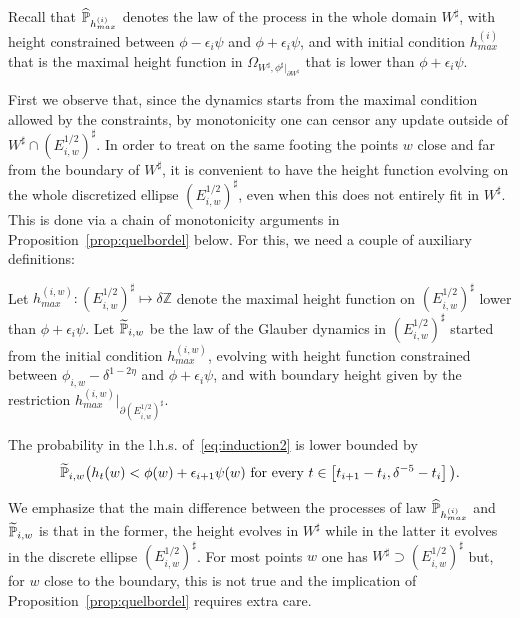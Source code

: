 \documentclass[AHL,Unicode,longabstracts,published]{cedram}
\newcommand{\Z}{\mathbb{Z}}
\renewcommand{\P}{\mathbb{P}}
\newcommand{\eps}{\epsilon}
\renewcommand{\d}{{\sharp }}
\let\oldtilde\tilde
\renewcommand*{\tilde}[1]{\mathchoice{\widetilde{#1}}{\widetilde{#1}}{\oldtilde{#1}}{\oldtilde{#1}}}
\let\oldhat\hat
\renewcommand*{\hat}[1]{\mathchoice{\widehat{#1}}{\widehat{#1}}{\oldhat{#1}}{\oldhat{#1}}}
\begin{document}
Recall that $\hat\P_{h^{(i)}_{max}}$ denotes the law of the process in the whole domain $W^\d$, with height constrained between $\phi-\epsilon_i\psi$ and $\phi+\epsilon_i\psi$, and with initial condition $h^{(i)}_{max}$ that is the maximal height function in $\Omega_{W^\d,\phi^\d|_{\partial W^\d}}$ that is lower than $\phi+\epsilon_i\psi$.

First we observe that, since the dynamics starts from the maximal condition allowed by the constraints, by monotonicity one can censor any update outside of $W^\d \cap (E^{1/2}_{i,w})^\d$. In order to treat on the same footing the points $w$ close and far from the boundary of $W^\d$, it is convenient to have the height function evolving on the whole discretized ellipse $(E^{1/2}_{i,w})^\d$, even when this does not entirely fit in $W^\d$. This is done via a chain of monotonicity arguments in Proposition~\ref{prop:quelbordel} below. For this, we need a couple of auxiliary definitions:
\begin{defi}
Let $h_{max}^{(i,w)}:(E^{1/2}_{i,w})^\d\mapsto \delta\Z$ denote the maximal height function on $(E^{1/2}_{i,w})^\d$ lower than $\phi+\epsilon_i\psi$. Let $\tilde\P_{i,w}$ be the law of the Glauber dynamics in $(E^{1/2}_{i,w})^\d$ started from the initial condition $ h_{max}^{(i,w)}$, evolving with height function constrained between $\phi_{i,w}-\delta^{1-2\eta}$ and $\phi+\epsilon_i\psi$, and with boundary height given by the restriction $h_{max}^{(i,w)}|_{\partial (E^{1/2}_{i,w})^\d}$.
\end{defi}

\begin{prop}\label{prop:quelbordel}
The probability in the l.h.s. of~\eqref{eq:induction2} is lower bounded by
\begin{equation}\label{eq:tildep}
\tilde \P_{i,w}\big(h_t(w) < \phi(w) + \eps_{i+1} \psi(w) \text{ for every } t\in \left[t_{i+1} - t_i, \delta^{-5}- t_i\right]\big).
\end{equation}
\end{prop}

We emphasize that the main difference between the processes of law $\hat \P_{h^{(i)}_{max}}$ and $\tilde \P_{i,w}$ is that in the former, the height evolves in $W^\d$ while in the latter it evolves in the discrete ellipse $(E^{1/2}_{i,w})^\d$. For most points $w$ one has $W^\d\supset (E^{1/2}_{i,w})^\d$ but, for $w$ close to the boundary, this is not true and the implication of Proposition~\ref{prop:quelbordel} requires extra care.
\end{document}
